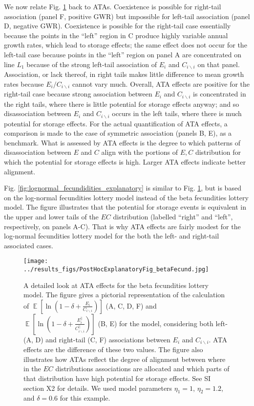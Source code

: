 \documentclass[letterpaper,11pt]{article}
\DeclareMathOperator{\E}{\mathbb{E}}%
\newcommand{\bs}{\backslash}
\begin{document}
We now relate Fig. \ref{fig:beta_fecundidities_explanatory} back to ATAs. Coexistence is possible for 
right-tail association (panel F, positive GWR) but impossible for left-tail association (panel D,
negative GWR). Coexistence is possible for the right-tail case essentially
because the points in the ``left'' region in C produce highly variable
annual growth rates, which lead to storage effects; the same effect does 
not occur for the left-tail case because 
points in the ``left'' region on panel A are concentrated on line $L_1$ because of the
strong left-tail association of $E_i$ and $C_{i \bs i}$ on that panel. 
Association, or lack thereof, in right tails makes little difference 
to mean growth rates because $E_i/C_{i \bs i}$ cannot vary much. Overall, ATA effects 
are positive for the right-tail case because strong association between 
$E_i$ and $C_{i \bs i}$ is concentrated in the right tails, where there 
is little potential for storage effects anyway; and so disassociation between
$E_i$ and $C_{i \bs i}$ occurs in the left tails, where there is much potential for
storage effects. For the actual quantification of ATA effects,
a comparison is made to the case of symmetric association 
(panels B, E), as a benchmark. What is assessed by ATA
effects is the degree to which patterns of disassociation between 
$E$ and $C$ align with the portions of $E,C$ distribution for which the potential
for storage effects is high. Larger ATA effects indicate better alignment.

Fig. \ref{fig:lognormal_fecundidities_explanatory} is similar to 
Fig. \ref{fig:beta_fecundidities_explanatory}, but is based on the log-normal 
fecundities lottery model instead of the beta fecundities lottery model. 
The figure illustrates that the potential for storage events is equivalent in
the upper and lower tails of the $EC$ distribution (labelled ``right'' and ``left'',
respectively, on panels A-C). That is why ATA effects are fairly modest for the 
log-normal fecundities lottery model for the both the left- and right-tail
associated cases. 

\begin{figure}
\texttt{[image: ../results\_figs/PostHocExplanatoryFig\_betaFecund.jpg]}
\caption{A detailed look at ATA effects for the beta fecundities lottery model.
The figure gives a pictorial representation of the calculation of  
$\E \left[ \ln \left( 1-\delta+\frac{E_i}{C_{i \bs i}} \right) \right]$ (A, C, D, F) and 
$\E \left[ \ln \left( 1-\delta+\frac{E_i^{||}}{C_{i \bs i}^{||}} \right) \right]$ (B, E)
for the model, considering both left- (A, D) and right-tail (C, F) associations
between $E_i$ and $C_{i \bs i}$. ATA effects are the difference of these two values.
The figure also illustrates how ATAs reflect the degree of alignment between where 
in the $EC$ distributions associations are allocated and which parts of that distribution
have high potential for storage effects. See SI section X2
for details. We used model parameters $\eta_1 = 1$, $\eta_2 = 1.2$, and $\delta=0.6$
for this example.}\label{fig:beta_fecundidities_explanatory}
\end{figure}
\end{document}
